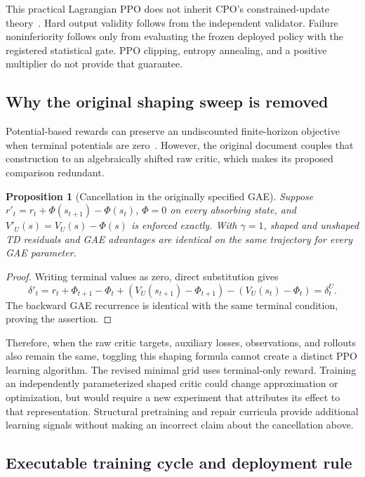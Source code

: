 \documentclass[11pt,a4paper]{article}
\newtheorem{proposition}{Proposition}[section]
\theoremstyle{definition}\newtheorem{definition}[proposition]{Definition}
\begin{document}
This practical Lagrangian PPO does not inherit CPO's constrained-update theory~\cite{cpo2017}.
Hard output validity follows from the independent validator. Failure noninferiority follows only
from evaluating the frozen deployed policy with the registered statistical gate. PPO clipping,
entropy annealing, and a positive multiplier do not provide that guarantee.

\subsection{Why the original shaping sweep is removed}

Potential-based rewards can preserve an undiscounted finite-horizon objective when terminal
potentials are zero~\cite{shaping1999}. However, the original document couples that construction to
an algebraically shifted raw critic, which makes its proposed comparison redundant.

\begin{proposition}[Cancellation in the originally specified GAE]
Suppose \(r'_t=r_t+\Phi(s_{t+1})-\Phi(s_t)\), \(\Phi=0\) on every absorbing state, and
\(V'_U(s)=V_U(s)-\Phi(s)\) is enforced exactly. With \(\gamma=1\), shaped and unshaped TD
residuals and GAE advantages are identical on the same trajectory for every GAE parameter.
\end{proposition}
\begin{proof}
Writing terminal values as zero, direct substitution gives
\[
 \delta'_t=r_t+\Phi_{t+1}-\Phi_t+
 (V_U(s_{t+1})-\Phi_{t+1})-(V_U(s_t)-\Phi_t)
 =\delta_t^U.
\]
The backward GAE recurrence is identical with the same terminal condition, proving the assertion.
\end{proof}

Therefore, when the raw critic targets, auxiliary losses, observations, and rollouts also remain
the same, toggling this shaping formula cannot create a distinct PPO learning algorithm. The revised
minimal grid uses terminal-only reward. Training an independently parameterized shaped critic could
change approximation or optimization, but would require a new experiment that attributes its effect
to that representation. Structural pretraining and repair curricula provide additional learning
signals without making an incorrect claim about the cancellation above.

\subsection{Executable training cycle and deployment rule}
\end{document}
